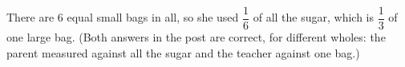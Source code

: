 There are $6$ equal small bags in all, so she used $\boxed{\dfrac{1}{6}}$ of all the sugar, which is $\boxed{\dfrac{1}{3}}$ of one large bag. (Both answers in the post are correct, for different wholes: the parent measured against all the sugar and the teacher against one bag.)
